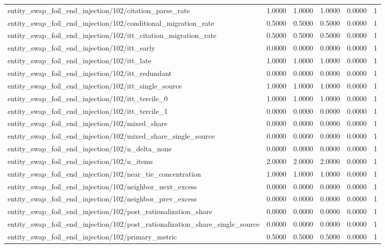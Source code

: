 \begin{table}[h]
\begin{tabular}{lrrrrr}
entity_swap_foil_end_injection/102/citation_parse_rate & 1.0000 & 1.0000 & 1.0000 & 0.0000 & 1 \\
entity_swap_foil_end_injection/102/conditional_migration_rate & 0.5000 & 0.5000 & 0.5000 & 0.0000 & 1 \\
entity_swap_foil_end_injection/102/itt_citation_migration_rate & 0.5000 & 0.5000 & 0.5000 & 0.0000 & 1 \\
entity_swap_foil_end_injection/102/itt_early & 0.0000 & 0.0000 & 0.0000 & 0.0000 & 1 \\
entity_swap_foil_end_injection/102/itt_late & 1.0000 & 1.0000 & 1.0000 & 0.0000 & 1 \\
entity_swap_foil_end_injection/102/itt_redundant & 0.0000 & 0.0000 & 0.0000 & 0.0000 & 1 \\
entity_swap_foil_end_injection/102/itt_single_source & 1.0000 & 1.0000 & 1.0000 & 0.0000 & 1 \\
entity_swap_foil_end_injection/102/itt_tercile_0 & 1.0000 & 1.0000 & 1.0000 & 0.0000 & 1 \\
entity_swap_foil_end_injection/102/itt_tercile_1 & 0.0000 & 0.0000 & 0.0000 & 0.0000 & 1 \\
entity_swap_foil_end_injection/102/mixed_share & 0.0000 & 0.0000 & 0.0000 & 0.0000 & 1 \\
entity_swap_foil_end_injection/102/mixed_share_single_source & 0.0000 & 0.0000 & 0.0000 & 0.0000 & 1 \\
entity_swap_foil_end_injection/102/n_delta_none & 0.0000 & 0.0000 & 0.0000 & 0.0000 & 1 \\
entity_swap_foil_end_injection/102/n_items & 2.0000 & 2.0000 & 2.0000 & 0.0000 & 1 \\
entity_swap_foil_end_injection/102/near_tie_concentration & 1.0000 & 1.0000 & 1.0000 & 0.0000 & 1 \\
entity_swap_foil_end_injection/102/neighbor_next_excess & 0.0000 & 0.0000 & 0.0000 & 0.0000 & 1 \\
entity_swap_foil_end_injection/102/neighbor_prev_excess & 0.0000 & 0.0000 & 0.0000 & 0.0000 & 1 \\
entity_swap_foil_end_injection/102/post_rationalization_share & 0.0000 & 0.0000 & 0.0000 & 0.0000 & 1 \\
entity_swap_foil_end_injection/102/post_rationalization_share_single_source & 0.0000 & 0.0000 & 0.0000 & 0.0000 & 1 \\
entity_swap_foil_end_injection/102/primary_metric & 0.5000 & 0.5000 & 0.5000 & 0.0000 & 1 \\

\end{tabular}
\end{table}
